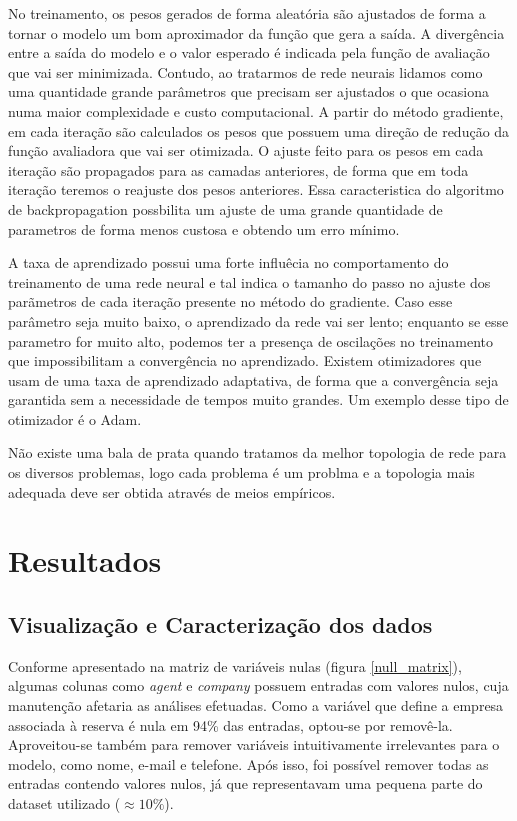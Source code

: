 \documentclass{homework}
\begin{document}
No treinamento, os pesos gerados de forma aleatória são ajustados de forma a tornar o modelo um bom aproximador da função que gera a saída. A divergência entre a saída do modelo e o valor esperado é indicada pela função de avaliação que vai ser minimizada. Contudo, ao tratarmos de rede neurais lidamos como uma quantidade grande parâmetros que precisam ser ajustados o que ocasiona numa maior complexidade e custo computacional. A partir do método gradiente, em cada iteração são calculados os pesos que possuem uma direção de redução da função avaliadora que vai ser otimizada. O ajuste feito para os pesos em cada iteração são propagados para as camadas anteriores, de forma que em toda iteração teremos o reajuste dos pesos anteriores. Essa caracteristica do algoritmo de backpropagation possbilita um ajuste de uma grande quantidade de parametros de forma menos custosa e obtendo um erro mínimo.

A taxa de aprendizado possui uma forte influêcia no comportamento do treinamento de uma rede neural e tal indica o tamanho do passo no ajuste dos parãmetros de cada iteração presente no método do gradiente. Caso esse parâmetro seja muito baixo, o aprendizado da rede vai ser lento; enquanto se esse parametro for muito alto, podemos ter a presença de oscilações no treinamento que impossibilitam a convergência no aprendizado. Existem otimizadores que usam de uma taxa de aprendizado adaptativa, de forma que a convergência seja garantida sem a necessidade de tempos muito grandes. Um exemplo desse tipo de otimizador é o Adam. 

Não existe uma bala de prata quando tratamos da melhor topologia de rede para os diversos problemas, logo cada problema é um problma e a topologia mais adequada deve ser obtida através de meios empíricos. 



\section{Resultados}
\label{resultados}

\subsection{Visualização e Caracterização dos dados}

Conforme apresentado na matriz de variáveis nulas (figura \ref{null_matrix}), algumas colunas como \textit{agent} e
\textit{company} possuem entradas com valores nulos, cuja manutenção afetaria as análises efetuadas. Como a variável que
define a empresa associada à reserva é nula em 94\% das entradas, optou-se por removê-la. Aproveitou-se também para
remover variáveis intuitivamente irrelevantes para o modelo, como nome, e-mail e telefone. Após isso, foi possível
remover todas as entradas contendo valores nulos, já que representavam uma pequena parte do dataset utilizado
($\approx10\%$).
\end{document}

